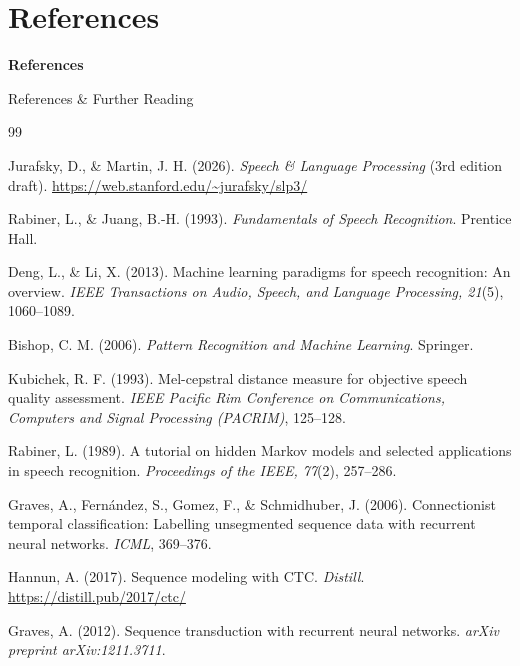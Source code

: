 \section{References}

\begin{frame}{}
    \LARGE \textbf{References}
\end{frame}

\begin{frame}[allowframebreaks]{References \& Further Reading}
    \small

    \begin{thebibliography}{99}

Jurafsky, D., \& Martin, J. H. (2026). \textit{Speech \& Language Processing} (3rd edition draft). \url{https://web.stanford.edu/~jurafsky/slp3/}

Rabiner, L., \& Juang, B.-H. (1993). \textit{Fundamentals of Speech Recognition}. Prentice Hall.

Deng, L., \& Li, X. (2013). Machine learning paradigms for speech recognition: An overview. \textit{IEEE Transactions on Audio, Speech, and Language Processing, 21}(5), 1060--1089.

Bishop, C. M. (2006). \textit{Pattern Recognition and Machine Learning}. Springer.

Kubichek, R. F. (1993). Mel-cepstral distance measure for objective speech quality assessment. \textit{IEEE Pacific Rim Conference on Communications, Computers and Signal Processing (PACRIM)}, 125--128.

Rabiner, L. (1989). A tutorial on hidden Markov models and selected applications in speech recognition. \textit{Proceedings of the IEEE, 77}(2), 257--286.

Graves, A., Fernández, S., Gomez, F., \& Schmidhuber, J. (2006). Connectionist temporal classification: Labelling unsegmented sequence data with recurrent neural networks. \textit{ICML}, 369--376.

Hannun, A. (2017). Sequence modeling with CTC. \textit{Distill}. \url{https://distill.pub/2017/ctc/}

Graves, A. (2012). Sequence transduction with recurrent neural networks. \textit{arXiv preprint arXiv:1211.3711}.


\end{thebibliography}
\end{frame}
